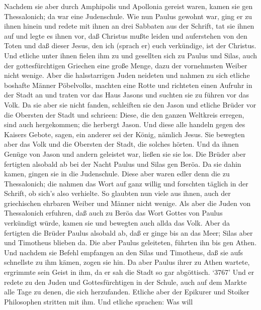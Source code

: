  Nachdem sie aber durch Amphipolis und Apollonia gereist
waren, kamen sie gen Thessalonich; da war eine Judenschule. 
Wie nun Paulus gewohnt war, ging er zu ihnen hinein und redete mit ihnen
an drei Sabbaten aus der Schrift,  tat sie ihnen auf und
legte es ihnen vor, daß Christus mußte leiden und auferstehen von den
Toten und daß dieser Jesus, den ich (sprach er) euch verkündige, ist der
Christus.  Und etliche unter ihnen fielen ihm zu und
gesellten sich zu Paulus und Silas, auch der gottesfürchtigen Griechen
eine große Menge, dazu der vornehmsten Weiber nicht wenige. 
Aber die halsstarrigen Juden neideten und nahmen zu sich etliche
boshafte Männer Pöbelvolks, machten eine Rotte und richteten einen
Aufruhr in der Stadt an und traten vor das Haus Jasons und suchten sie
zu führen vor das Volk.  Da sie aber sie nicht fanden,
schleiften sie den Jason und etliche Brüder vor die Obersten der Stadt
und schrieen: Diese, die den ganzen Weltkreis erregen, sind auch
hergekommen;  die herbergt Jason. Und diese alle handeln
gegen des Kaisers Gebote, sagen, ein anderer sei der König, nämlich
Jesus.  Sie bewegten aber das Volk und die Obersten der
Stadt, die solches hörten.  Und da ihnen Genüge von Jason
und andern geleistet war, ließen sie sie los.  Die Brüder
aber fertigten alsobald ab bei der Nacht Paulus und Silas gen Beröa. Da
sie dahin kamen, gingen sie in die Judenschule.  Diese aber
waren edler denn die zu Thessalonich; die nahmen das Wort auf ganz
willig und forschten täglich in der Schrift, ob sich's also verhielte.
 So glaubten nun viele aus ihnen, auch der griechischen
ehrbaren Weiber und Männer nicht wenige.  Als aber die
Juden von Thessalonich erfuhren, daß auch zu Beröa das Wort Gottes von
Paulus verkündigt würde, kamen sie und bewegten auch allda das Volk.
 Aber da fertigten die Brüder Paulus alsobald ab, daß er
ginge bis an das Meer; Silas aber und Timotheus blieben da.
 Die aber Paulus geleiteten, führten ihn bis gen Athen. Und
nachdem sie Befehl empfangen an den Silas und Timotheus, daß sie aufs
schnellste zu ihm kämen, zogen sie hin.  Da aber Paulus
ihrer zu Athen wartete, ergrimmte sein Geist in ihm, da er sah die Stadt
so gar abgöttisch.  `3767' Und er redete zu den Juden und
Gottesfürchtigen in der Schule, auch auf dem Markte alle Tage zu denen,
die sich herzufanden.  Etliche aber der Epikurer und
Stoiker Philosophen stritten mit ihm. Und etliche sprachen: Was will

